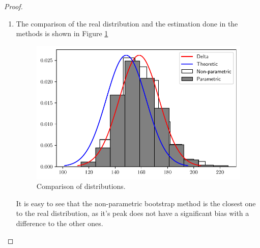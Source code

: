 \documentclass[11pt]{article}
\theoremstyle{definition}
\theoremstyle{remark}
\theoremstyle{remark}
\begin{document}
\begin{proof}
\begin{enumerate}[label=\alph*)]
  \item The comparison of the real distribution and the estimation
    done in the methods is shown in Figure \ref{fig:ex11}
    \begin{figure}[H]
      \centering
      \includegraphics[scale=0.5]{../figs/delta-np.pdf}
      \caption{Comparison of distributions.}
      \label{fig:ex11}
    \end{figure}
    It is easy to see that the non-parametric bootstrap method is the
    closest one to the real distribution, as it's peak does not have a
    significant bias with a difference to the other ones.
  \end{enumerate}
\end{proof}
\end{document}

